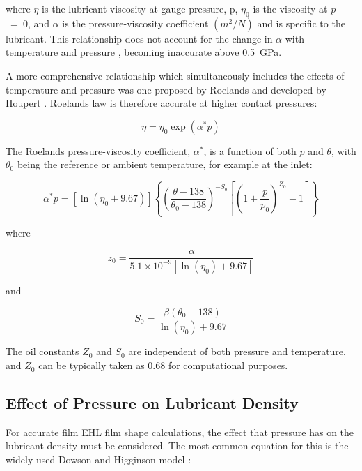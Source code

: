where $\eta$ is the lubricant viscosity at gauge pressure, p, $\eta_0$ is the viscosity at $p$~=~0, and $\alpha$ is the pressure-viscosity coefficient $({m}^2 /{N})$ and is specific to the lubricant. This relationship does not account for the change in $\alpha$ with temperature and pressure \cite{Gohar2019}, becoming inaccurate above 0.5~GPa.

A more comprehensive relationship which simultaneously includes the effects of temperature and pressure was one proposed by Roelands \cite{Roelands1966} and developed by Houpert \cite{Houpert1984}.  Roelands law is therefore accurate at higher contact pressures:

\begin{equation}\label{eq3.25}
    \eta=\eta_0 \exp \left(\alpha^* p\right)
\end{equation}

The Roelands pressure-viscosity coefficient, $\alpha^\ast$, is a function of both $p$ and $\theta$, with $\theta_0$ being the reference or ambient temperature, for example at the inlet:

\begin{equation}\label{eq3.26}
	\alpha^* p=\left[\ln \left(\eta_0+9.67\right)\right]\left\{\left(\frac{\theta-138}{\theta_0-138}\right)^{-S_0}\left[\left(1+\frac{p}{p_0}\right)^{Z_0}-1\right]\right\}
\end{equation}

where

\begin{equation}\label{eq3.27}
	z_0=\frac{\alpha}{5.1 \times 10^{-9}\left[\ln \left(\eta_0\right)+9.67\right]}
\end{equation}

and

\begin{equation}\label{eq3.28}
	S_0=\frac{\beta\left(\theta_0-138\right)}{\ln \left(\eta_0\right)+9.67}
\end{equation}

The oil constants $Z_0$ and $S_0$ are independent of both pressure and temperature, and $Z_0$ can be typically taken as 0.68 for computational purposes.

\subsection{Effect of Pressure on Lubricant Density}

For accurate film EHL film shape calculations, the effect that pressure has on the lubricant density must be considered. The most common equation for this is the widely used Dowson and Higginson model \cite{Dowson1977}:

